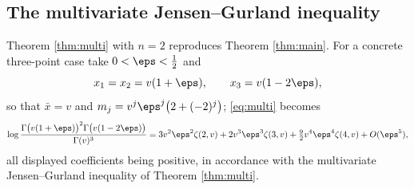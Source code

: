 \subsection{The multivariate Jensen--Gurland inequality}
Theorem \ref{thm:multi} with $n=2$ reproduces Theorem \ref{thm:main}. For a concrete
three-point case take $0<\eps<\tfrac12$ and
\[
  x_{1}=x_{2}=v(1+\eps),\qquad x_{3}=v(1-2\eps),
\]
so that $\bar x=v$ and $m_{j}=v^{j}\eps^{j}\big(2+(-2)^{j}\big)$; \eqref{eq:multi} becomes
\[
  \log\frac{\Gamma\big(v(1+\eps)\big)^{2}\Gamma\big(v(1-2\eps)\big)}{\Gamma(v)^{3}}
   =3v^{2}\eps^{2}\zeta(2,v)+2v^{3}\eps^{3}\zeta(3,v)
    +\tfrac92v^{4}\eps^{4}\zeta(4,v)+O(\eps^{5}),
\]
all displayed coefficients being positive, in accordance with the multivariate
Jensen--Gurland inequality of Theorem \ref{thm:multi}.
